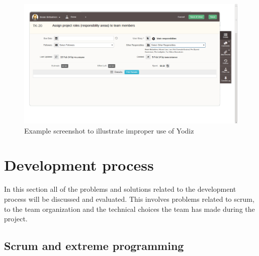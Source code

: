 \begin{figure}[H]
\includegraphics[width=\textwidth, clip, trim=1cm 2cm 4cm 1cm]{ch/retrospect/fig/wrongUse.png}
\caption{Example screenshot to illustrate improper use of Yodiz}
\label{fig:wrongUse}
\end{figure}

\section{Development process}
In this section all of the problems and solutions related to the development process will be discussed and evaluated. This involves problems related to scrum, to the team organization and the technical choices the team has made during the project. 

\subsection{Scrum and extreme programming}

